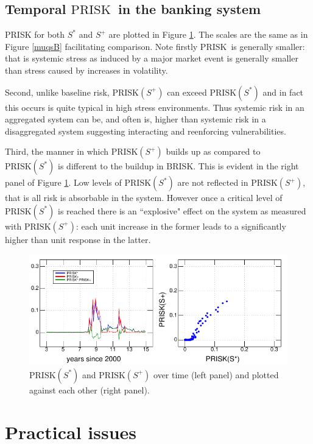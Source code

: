 \documentclass[authoryear]{elsarticle}
\newcommand{\fref}[1]{Figure \ref{#1}}
\newcommand{\br}{\ensuremath{\mathrm{BRISK}}}
\newcommand{\pr}{\ensuremath{\mathrm{PRISK}}}
\begin{document}
\subsection{Temporal \pr\  in the banking system}\label{Paggregate}

PRISK for both $S^*$ and $S^+$ are plotted in \fref{muqsP}.  The scales are the same as in \fref{muqsB} facilitating comparison.   Note firstly \pr\ is generally smaller: that is systemic stress as induced by a major market event is generally smaller than stress caused by increases in volatility.

Second, unlike baseline risk,   $\pr(S^+)$ can exceed $\pr(S^*)$ and in fact this occurs is quite typical in high stress environments.   Thus systemic risk in an aggregated system can be, and often is, higher than systemic risk in a disaggregated system suggesting interacting and reenforcing vulnerabilities.

Third, the manner in which $\pr(S^+)$ builds up as compared to $\pr(S^*)$ is different to the buildup in \br.   This is evident in the right panel of \fref{muqsP}.  Low levels of $\pr(S^*)$ are not reflected in $\pr(S^+)$, that is all risk is absorbable in the system.   However once a critical level of $\pr(S^*)$ is reached there is an ``explosive" effect on the system as measured with $\pr(S^+)$: each unit increase in the former leads to a significantly higher than unit response in the latter.

\begin{figure}[htbp]
\begin{center}
\includegraphics[width=12cm]{figures/muqsP.pdf}
\caption{$\pr(S^*)$ and $\pr(S^+)$ over time (left panel) and plotted against each other (right panel).}\label{muqsP}
\end{center}
\end{figure}




\section{Practical issues}\label{s_concl}
\end{document}
